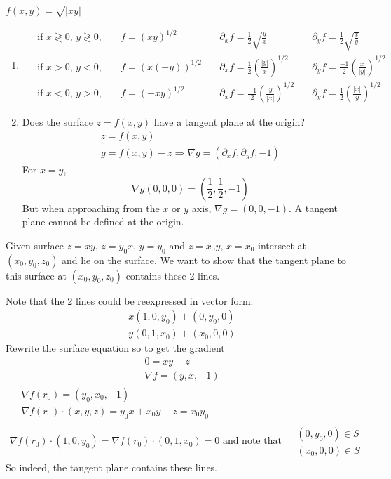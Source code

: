 \documentclass[twoside]{amsart}
\theoremstyle{plain}
\theoremstyle{definition}
\newcommand{\exercisehead}[1]
  {
   \noindent{\small\bf Exercise #1.}
   \smallskip}
\begin{document}
\exercisehead{6} $f(x,y) = \sqrt{ |xy|}$ 
\begin{enumerate}
\item \[
\begin{aligned}
  & \text{ if } x \gtrless 0, \, y \gtrless 0, \quad & f=(xy)^{1/2} \quad & \partial_x f = \frac{1}{2} \sqrt{ \frac{y}{x}}  \quad \quad & \partial_y f = \frac{1}{2} \sqrt{ \frac{x}{y} } \\
  & \text{ if } x > 0, \, y < 0 , \quad & f= (x(-y))^{1/2} \quad & \partial_x f = \frac{1}{2} \left( \frac{|y|}{x} \right)^{1/2} \quad & \partial_y f = \frac{-1}{2} \left( \frac{x}{|y|} \right)^{1/2} \\
  & \text{ if } x <0, \, y > 0, \quad & f = (-xy)^{1/2} \quad & \partial_x f = \frac{-1}{2} \left( \frac{y}{|x|} \right)^{1/2} \quad & \partial_y f = \frac{1}{2} \left( \frac{|x|}{y} \right)^{1/2}
\end{aligned}
\]
\item Does the surface $z= f(x,y)$ have a tangent plane at the origin?
\[
\begin{gathered}
  z = f(x,y) \\
  g = f(x,y) -z \Longrightarrow \nabla g = (\partial_x f, \partial_y f,-1)
\end{gathered}
\]
For $x=y$,
\[
\nabla g(0,0,0) = \left( \frac{1}{2}, \frac{1}{2}, -1 \right)
\]
But when approaching from the $x$ or $y$ axis, $\nabla g = (0,0,-1)$.  A tangent plane cannot be defined at the origin.  
\end{enumerate}

\exercisehead{7} Given surface $z = xy$, $z = y_0 x,\, y = y_0$ and $z = x_0 y, \, x = x_0$ intersect at $(x_0,y_0, z_0)$ and lie on the surface.  We want to show that the tangent plane to this surface at $(x_0,y_0,z_0)$ contains these 2 lines.  

Note that the 2 lines could be reexpressed in vector form:
\[
\begin{gathered}
  x (1,0,y_0) + (0,y_0,0) \\
  y(0,1,x_0) + (x_0,0,0) 
\end{gathered}
\]
Rewrite the surface equation so to get the gradient
\[
\begin{gathered}
  0 = xy - z \\
  \nabla f = (y,x,-1) 
\end{gathered}
\]
\[
\begin{gathered}
\begin{aligned}
  & \nabla f(r_0) = (y_0,x_0,-1) \\
  & \nabla f(r_0) \cdot (x,y,z) = y_0 x + x_0 y - z = x_0 y_0 
\end{aligned} \\
\nabla f(r_0) \cdot (1,0,y_0) = \nabla f(r_0) \cdot (0,1,x_0) = 0  \text{ and note that } \begin{aligned}
  & (0,y_0,0) \in S \\
  & (x_0,0,0) \in S
\end{aligned}
\end{gathered}
\]
So indeed, the tangent plane contains these lines.  
\end{document}
